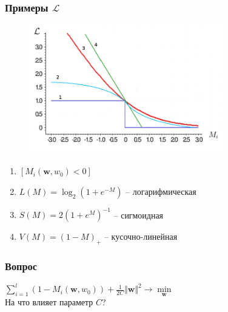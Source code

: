 \documentclass[12pt]{beamer}
\begin{document}
\begin{frame}\frametitle{Примеры $\mathcal{L}$}
\begin{figure}[htbp]
  \includegraphics[height=160pt, keepaspectratio = true]{images/l}
\end{figure}
\begin{enumerate}
\item $\left[M_i(\mathbf{w}, w_0) < 0 \right]$
\item $L(M) = \log_2(1+e^{-M})$ -- логарифмическая
\item $S(M) = 2(1+e^M)^{-1}$ -- сигмоидная
\item $V(M) = (1-M)_+$ -- кусочно-линейная
\end{enumerate}
\end{frame}

\begin{frame}\frametitle{Вопрос}
$ \sum\limits_{i=1}^l (1 - M_i(\mathbf{w}, w_0)) + \frac{1}{2C}\Vert \mathbf{w} \Vert^2 \rightarrow \min\limits_{\mathbf{w}}$\\
\vspace{5mm}
На что влияет параметр $C$?
\end{frame}
\end{document}
